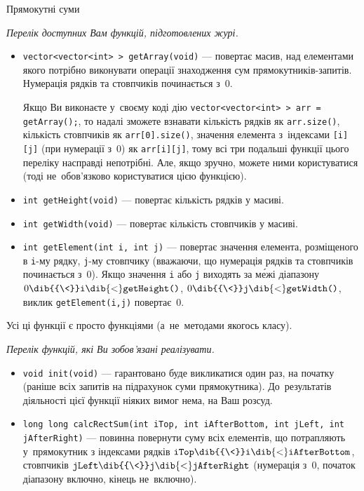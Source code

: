 \begin{problemAllDefault}{Прямокутні суми}

\par\noindent\emph{Перелік доступних Вам функцій, підготовлених журі.}

\begin{itemize}
\item
\texttt{vector<vector<int>~> getArray(void)} --- повертає масив, над елементами якого потрібно виконувати операції знаходження сум прямокутників-запитів. Нумерація рядків та стовпчиків починається з~0.

Якщо Ви виконаєте у~своєму коді дію \texttt{vector<vector<int>~> arr = getArray();}, то надалі зможете взнавати кількість рядків як \texttt{arr.size()}, кількість стовпчиків як \texttt{arr[0].size()}, значення елемента з~індексами \texttt{[i][j]} (при нумерації з~0) як \texttt{arr[i][j]}, тому всі три подальші функції цього переліку насправді непотрібні. Але, якщо зручно, можете ними користуватися (тоді не~обов'язково користуватися цією функцією).

\item
\texttt{int getHeight(void)} --- повертає кількість рядків у масиві.

\item
\texttt{int getWidth(void)} --- повертає кількість стовпчиків у масиві.

\item
\texttt{int getElement(int~i, int~j)} --- повертає значення елемента, розміщеного в \texttt{i}-му рядку, \texttt{j}-му стовпчику (вважаючи, що нумерація рядків та стовпчиків починається з~0). Якщо значення \texttt{i} або \texttt{j} виходять за м\'{е}жі діапазону 
$0\dib{{\<}}\texttt{i}\dib{{<}}\texttt{getHeight()}$,
$0\dib{{\<}}\texttt{j}\dib{{<}}\texttt{getWidth()}$,
виклик \texttt{getElement(i,j)} повертає~0.
\end{itemize}
Усі ці функції є просто функціями (а~не~методами якогось класу).

\medskip
\noindent\emph{Перелік функцій, які Ви зобов'язані реалізувати.}
\begin{itemize}
\item
\texttt{void init(void)} --- гарантовано буде викликатися один раз, на початку (раніше всіх запитів на підрахунок суми прямокутника). До~результатів діяльності цієї функції ніяких вимог нема, на Ваш розсуд.
\item
\texttt{long long calcRectSum(int iTop, int iAfterBottom, int jLeft, int jAfterRight)} --- повинна повернути суму всіх елементів, що потрапляють у~прямокутник з індексами рядків 
$\texttt{iTop}\dib{{\<}}\texttt{i}\dib{{<}}\texttt{iAfterBottom}$,
стовпчиків
$\texttt{jLeft}\dib{{\<}}\texttt{j}\dib{{<}}\texttt{jAfterRight}$
(нумерація з~0, початок діапазону включно, кінець не~включно).


\end{itemize}
\end{problemAllDefault}
